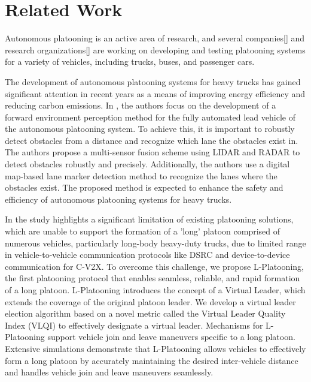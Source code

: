 \chapter{Related Work} 


Autonomous platooning is an active area of research, and several companies[] and research organizations[] are working on developing and testing platooning systems for a variety of vehicles, including trucks, buses, and passenger cars.

The development of autonomous platooning systems for heavy trucks has gained significant attention in recent years as a means of improving energy efficiency and reducing carbon emissions. In \cite{lit_1}, the authors focus on the development of a forward environment perception method for the fully automated lead vehicle of the autonomous platooning system. To achieve this, it is important to robustly detect obstacles from a distance and recognize which lane the obstacles exist in. The authors propose a multi-sensor fusion scheme using LIDAR and RADAR to detect obstacles robustly and precisely. Additionally, the authors use a digital map-based lane marker detection method to recognize the lanes where the obstacles exist. The proposed method is expected to enhance the safety and efficiency of autonomous platooning systems for heavy trucks.

In \cite{lit_2} the study highlights a significant limitation of existing platooning solutions, which are unable to support the formation of a 'long' platoon comprised of numerous vehicles, particularly long-body heavy-duty trucks, due to limited range in vehicle-to-vehicle communication protocols like DSRC and device-to-device communication for C-V2X. To overcome this challenge, we propose L-Platooning, the first platooning protocol that enables seamless, reliable, and rapid formation of a long platoon. L-Platooning introduces the concept of a Virtual Leader, which extends the coverage of the original platoon leader. We develop a virtual leader election algorithm based on a novel metric called the Virtual Leader Quality Index (VLQI) to effectively designate a virtual leader. Mechanisms for L-Platooning support vehicle join and leave maneuvers specific to a long platoon. Extensive simulations demonstrate that L-Platooning allows vehicles to effectively form a long platoon by accurately maintaining the desired inter-vehicle distance and handles vehicle join and leave maneuvers seamlessly.

